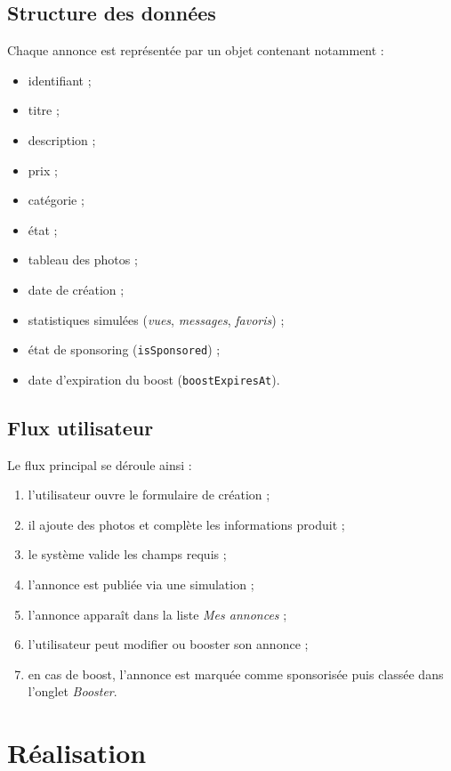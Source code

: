 \documentclass[12pt,a4paper]{report}
\begin{document}
\section{Structure des données}
Chaque annonce est représentée par un objet contenant notamment :
\begin{itemize}
  \item identifiant ;
  \item titre ;
  \item description ;
  \item prix ;
  \item catégorie ;
  \item état ;
  \item tableau des photos ;
  \item date de création ;
  \item statistiques simulées (\textit{vues}, \textit{messages}, \textit{favoris}) ;
  \item état de sponsoring (\texttt{isSponsored}) ;
  \item date d'expiration du boost (\texttt{boostExpiresAt}).
\end{itemize}

\section{Flux utilisateur}
Le flux principal se déroule ainsi :
\begin{enumerate}
  \item l'utilisateur ouvre le formulaire de création ;
  \item il ajoute des photos et complète les informations produit ;
  \item le système valide les champs requis ;
  \item l'annonce est publiée via une simulation ;
  \item l'annonce apparaît dans la liste \textit{Mes annonces} ;
  \item l'utilisateur peut modifier ou booster son annonce ;
  \item en cas de boost, l'annonce est marquée comme sponsorisée puis classée dans l'onglet \textit{Booster}.
\end{enumerate}

\chapter{Réalisation}
\end{document}
